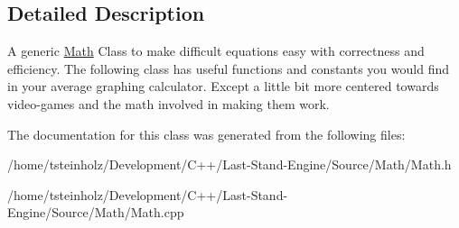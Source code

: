 \subsection{Detailed Description}
A generic \hyperlink{classMath}{Math} Class to make difficult equations easy with correctness and efficiency. The following class has useful functions and constants you would find in your average graphing calculator. Except a little bit more centered towards video-\/games and the math involved in making them work. 

The documentation for this class was generated from the following files\+:\begin{DoxyCompactItemize}
\item 
/home/tsteinholz/\+Development/\+C++/\+Last-\/\+Stand-\/\+Engine/\+Source/\+Math/Math.\+h\item 
/home/tsteinholz/\+Development/\+C++/\+Last-\/\+Stand-\/\+Engine/\+Source/\+Math/Math.\+cpp\end{DoxyCompactItemize}
